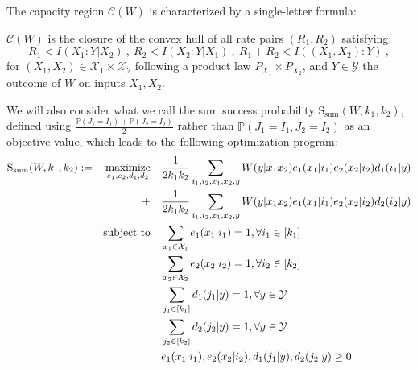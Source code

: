 The capacity region $\mathcal{C}(W)$ is characterized by a single-letter formula:

\begin{theorem}
  \label{theo:capacity}
  $\mathcal{C}(W)$ is the closure of the convex hull of all rate pairs $(R_1,R_2)$ satisfying:
  \[ R_1 < I(X_1:Y|X_2)\ ,\ R_2 < I(X_2:Y|X_1)\ ,\ R_1+R_2 < I((X_1,X_2):Y) \ ,\]
  for $(X_1,X_2) \in \mathcal{X}_1 \times \mathcal{X}_2$ following a product law $P_{X_1} \times P_{X_2}$, and $Y \in \mathcal{Y}$ the outcome of $W$ on inputs $X_1,X_2$.
\end{theorem}


We will also consider what we call the sum success probability $\mathrm{S}_{\text{sum}}(W,k_1,k_2)$, defined using $\frac{\mathbb{P}\left(J_1=I_1\right)+\mathbb{P}\left(J_2=I_2\right)}{2}$ rather than $\mathbb{P}\left(J_1=I_1,J_2=I_2\right)$ as an objective value, which leads to the following optimization program:
\begin{equation}
  \begin{aligned}
    \mathrm{S}_{\text{sum}}(W,k_1,k_2) := &&\underset{e_1,e_2,d_1,d_2}{\operatorname{\text{maximize}}} &&& \frac{1}{2k_1k_2} \sum_{i_1,i_2,x_1,x_2,y} W(y|x_1x_2)e_1(x_1|i_1)e_2(x_2|i_2)d_1(i_1|y)\\
    &&+&&& \frac{1}{2k_1k_2} \sum_{i_1,i_2,x_1,x_2,y} W(y|x_1x_2)e_1(x_1|i_1)e_2(x_2|i_2)d_2(i_2|y)\\
    &&\operatorname{\text{subject to}} &&& \sum_{x_1 \in \mathcal{X}_1} e_1(x_1|i_1) = 1, \forall i_1 \in [k_1]\\
    &&&&&  \sum_{x_2 \in \mathcal{X}_2} e_2(x_2|i_2) = 1, \forall i_2 \in [k_2]\\
    &&&&& \sum_{j_1 \in [k_1]} d_1(j_1|y) = 1, \forall y \in \mathcal{Y}\\
    &&&&& \sum_{j_2 \in [k_2]} d_2(j_2|y) = 1, \forall y \in \mathcal{Y}\\
    &&&&& e_1(x_1|i_1), e_2(x_2|i_2), d_1(j_1|y), d_2(j_2|y) \geq 0
  \end{aligned}
\end{equation}

